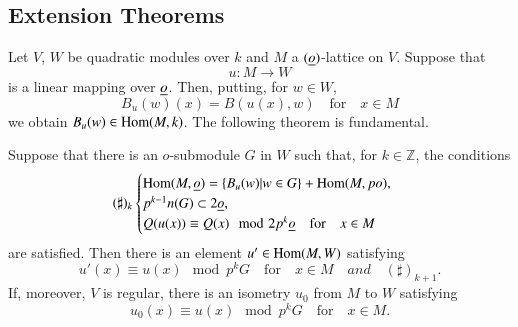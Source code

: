 \subsection{Extension Theorems}\label{c2:subsec2.1.4}\pageoriginale

Let $V$, $W$ be quadratic modules over $k$ and $M$ a $(\underline{o})$-lattice on
$V$. Suppose that
$$
u:M\to W
$$
is a linear mapping over $\underline{o}$. Then, putting, for $w\in W$,
$$
B_{u}(w)(x)=B(u(x),w)\quad\text{for}\quad x\in M
$$
we obtain $B_{u}(w)\in \operatorname{Hom}(M,k)$. The following theorem is
fundamental.

\setcounter{theorem}{13}
\begin{theorem}\label{c2:thm-2.14}
Suppose that there is an $o$-submodule $G$ in $W$ such that, for
$k\in\mathbb{Z}$, the conditions
$$
(\sharp)_{k}
\begin{cases}
\operatorname{Hom}(M,\underline{o})=\{B_{u}(w)|w\in G\}+\operatorname{Hom}(M,po),\\
p^{k-1}n(G)\subset 2\underline{o},\\
Q(u(x))\equiv Q(x)\mod 2p^{k}\underline{o}\quad\text{for}\quad x\in M
\end{cases}
$$
are satisfied. Then there is an element $u'\in \operatorname{Hom}(M,W)$ satisfying
$$
u'(x)\equiv u(x)\mod p^{k}G\quad\text{for}\quad x\in M\quad{and}\quad (\sharp)_{k+1}.
$$
If, moreover, $V$ is regular, there is an isometry $u_{0}$ from $M$ to
$W$ satisfying
$$
u_{0}(x)\equiv u(x)\mod p^{k}G\quad\text{for}\quad x\in M.
$$
\end{theorem}

